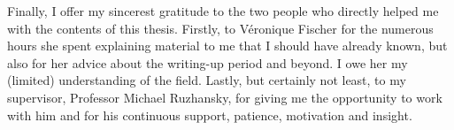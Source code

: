 Finally, I offer my sincerest gratitude to the two people who directly helped me with the contents of this thesis.
Firstly, to V\'eronique Fischer for the numerous hours she spent
explaining material to me that I should have already known,
but also for her advice about the writing-up period and beyond.
I owe her my (limited) understanding of the field.
Lastly, but certainly not least,
to my supervisor,
Professor Michael Ruzhansky,
for giving me the opportunity to work with him and for his continuous support, patience, motivation and insight.

